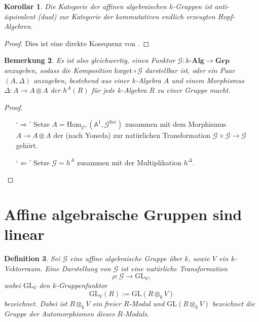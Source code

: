 \documentclass[a4paper, 11pt]{scrartcl}
\newcommand{\Hom}{\text{Hom}}
\newcommand{\CC}{\mathcal{C}}
\theoremstyle{basicstyle}
\newtheorem{definition}{Definition}[section]
\newtheorem{bemerkung}[definition]{Bemerkung}
\newtheorem{korollar}[definition]{Korollar}
\begin{document}
    \begin{korollar}
        Die Kategorie der affinen algebraischen \(k\)-Gruppen ist anti-äquivalent (dual) zur Kategorie der kommutativen endlich erzeugten Hopf-Algebren.
    \end{korollar}
    \begin{proof}
        Dies ist eine direkte Kosequenz von .
    \end{proof}

    \begin{bemerkung}
        Es ist also gleichwertig, einen Funktor \(\mathcal{G}: k\textbf{-Alg} \to \textbf{Grp}\) anzugeben, sodass die Komposition \(\text{forget} \circ \mathcal{G}\) darstellbar ist, oder ein Paar \((A, \Delta)\) anzugeben, bestehend aus einer \(k\)-Algebra \(A\) und einem Morphismus \(\Delta: A \to A \otimes A\) der \(h^A(R)\) für jede \(k\)-Algebra \(R\) zu einer Gruppe macht.
    \end{bemerkung}
    \begin{proof}
        \begin{enumerate}
            \item[`\(\Rightarrow\)'] Setze \(A = \Hom_{\CC^\vee}(\mathbb{A}^1, \mathcal{G}^{\text{Set}})\) zusammen mit dem Morphismus \(A \to A \otimes A\) der (nach Yoneda) zur natürlichen Transformation \(\mathcal{G} \times \mathcal{G} \to \mathcal{G}\) gehört.
            \item[`\(\Leftarrow\)'] Setze \(\mathcal{G} = h^A\) zusammen mit der Multiplikation \(h^\Delta\).
        \end{enumerate}
    \end{proof}


    \section{Affine algebraische Gruppen sind linear}

    \begin{definition}
        Sei \(\mathcal{G}\) eine affine algebraische Gruppe über \(k\), sowie \(V\) ein \(k\)-Vektorraum.
        Eine \emph{Darstellung} von \(\mathcal{G}\) ist eine natürliche Transformation
        \[\rho : \mathcal{G} \longrightarrow \text{GL}_V,\]
        wobei \(\text{GL}_V\) den \(k\)-Gruppenfunktor
        \[\text{GL}_V(R) := \text{GL}(R \otimes_k V)\]
        bezeichnet.
        Dabei ist \(R \otimes_k V\) ein freier \(R\)-Modul und \(\text{GL}(R \otimes_k V)\) bezeichnet die Gruppe der Automorphismen dieses \(R\)-Moduls.
    \end{definition}
\end{document}
